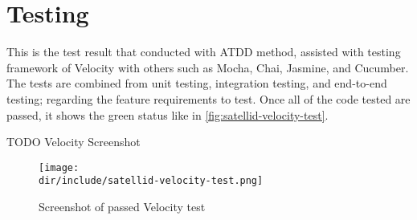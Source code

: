 \clearpage
\section{Testing}
\label{sec:testing}

This is the test result that conducted with \ac{ATDD} method, assisted with testing framework of Velocity with others such as Mocha, Chai, Jasmine, and Cucumber.
The tests are combined from unit testing, integration testing, and end-to-end testing; regarding the feature requirements to test.
Once all of the code tested are passed, it shows the green status like in \autoref{fig:satellid-velocity-test}.

TODO Velocity Screenshot

\begin{figure}[htb]
  \centering
  \texttt{[image: \\dir/include/satellid-velocity-test.png]}
  \caption{Screenshot of passed Velocity test}
  \label{fig:satellid-velocity-test}
\end{figure}
